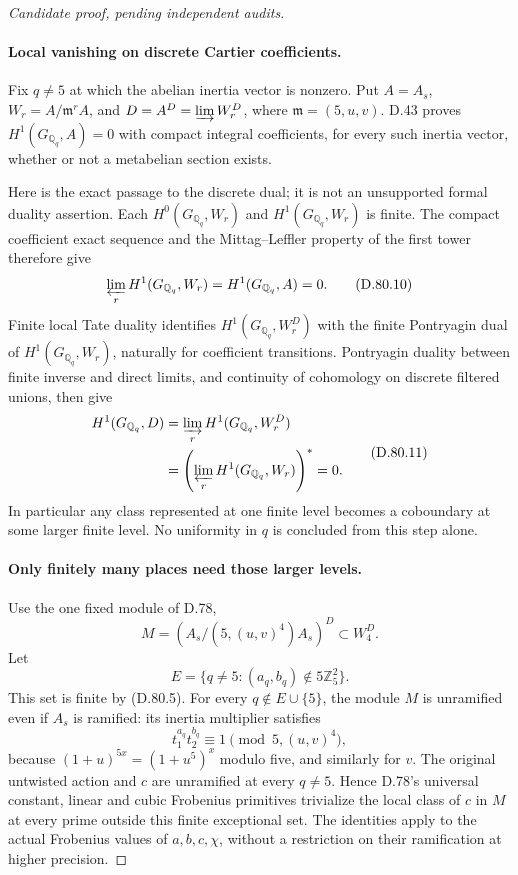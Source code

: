 \begin{proof}[Candidate proof, pending independent audits]
\paragraph{Local vanishing on discrete Cartier coefficients.}
Fix \(q\ne5\) at which the abelian inertia vector is
nonzero. Put \(A=A_s\), \(W_r=A/\mathfrak m^r A\),
and \(D=A^D=\varinjlim W_r^D\), where
\(\mathfrak m=(5,u,v)\). D.43 proves
\(H^1(G_{\mathbb Q_q},A)=0\) with compact integral
coefficients, for every such inertia vector, whether
or not a metabelian section exists.

Here is the exact passage to the discrete dual; it is
not an unsupported formal duality assertion. Each
\(H^0(G_{\mathbb Q_q},W_r)\) and
\(H^1(G_{\mathbb Q_q},W_r)\) is finite. The compact
coefficient exact sequence and the Mittag--Leffler
property of the first tower therefore give
\[
 \varprojlim_r H^1(G_{\mathbb Q_q},W_r)
                    =H^1(G_{\mathbb Q_q},A)=0.          \tag{D.80.10}
\]
Finite local Tate duality
\cite[I, Corollary 2.3]{DE_MilneADT} identifies
\(H^1(G_{\mathbb Q_q},W_r^D)\) with the finite
Pontryagin dual of \(H^1(G_{\mathbb Q_q},W_r)\),
naturally for coefficient transitions. Pontryagin
duality between finite inverse and direct limits, and
continuity of cohomology on discrete filtered unions,
then give
\[
 \begin{split}
 H^1(G_{\mathbb Q_q},D)
  &=\varinjlim_r H^1(G_{\mathbb Q_q},W_r^D)\\
  &=\left(\varprojlim_r H^1(G_{\mathbb Q_q},W_r)\right)^*
   =0.
 \end{split}                                             \tag{D.80.11}
\]
In particular any class represented at one finite level
becomes a coboundary at some larger finite level.
No uniformity in \(q\) is concluded from this step alone.

\paragraph{Only finitely many places need those larger levels.}
Use the one fixed module of D.78,
\[
          M=(A_s/(5,(u,v)^4)A_s)^D\subset W_4^D.
                                                               \tag{D.80.12}
\]
Let
\[
 E=\{q\ne5:(a_q,b_q)\notin5\mathbb Z_5^2\}.
                                                               \tag{D.80.13}
\]
This set is finite by (D.80.5). For every \(q\notin E\cup\{5\}\),
the module \(M\) is unramified even if \(A_s\) is ramified:
its inertia multiplier satisfies
\[
 t_1^{a_q}t_2^{b_q}\equiv1\pmod{5,(u,v)^4},             \tag{D.80.14}
\]
because \((1+u)^{5x}=(1+u^5)^x\) modulo five, and similarly
for \(v\). The original untwisted action and \(c\) are
unramified at every \(q\ne5\). Hence D.78's universal
constant, linear and cubic Frobenius primitives trivialize
the local class of \(c\) in \(M\) at every prime outside
this finite exceptional set. The identities apply to the
actual Frobenius values of \(a,b,c,\chi\), without a
restriction on their ramification at higher precision.


\end{proof}

